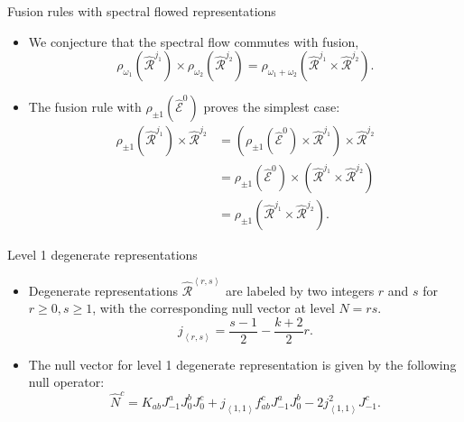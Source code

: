 \documentclass{beamer}
\newcommand{\vev}[1]{\left\langle #1 \right\rangle}
\begin{document}
\begin{frame}{Fusion rules with spectral flowed representations}
  \begin{itemize}
    \item We conjecture that the spectral flow commutes with fusion,  
      \begin{equation*}
          \rho_{\omega_{1}} \left(\widehat{\mathcal{R}}^{j_{1}}\right) \times \rho_{\omega_{2}} \left(\widehat{\mathcal{R}}^{j_{2}}\right) = \rho_{\omega_{1} + \omega_{2}} \left(\widehat{\mathcal{R}}^{j_{1}} \times\widehat{\mathcal{R}}^{j_{2}}\right). \label{SpecFus}
      \end{equation*}
    \item The fusion rule with $\rho_{\pm 1} \left(\widehat{\mathcal{E}}^{0}\right)$ proves the simplest case:
      \begin{equation*}
        \begin{aligned}
          \rho_{\pm 1} \left(\widehat{\mathcal{R}}^{j_{1}}\right) \times \widehat{\mathcal{R}}^{j_{2}} 
          &= \left(\rho_{\pm 1} \left( \widehat{\mathcal{E}}^{0} \right) \times \widehat{\mathcal{R}}^{j_{1}} \right) \times \widehat{\mathcal{R}}^{j_{2}}\\
          &= \rho_{\pm 1} \left( \widehat{\mathcal{E}}^{0} \right) \times \left( \widehat{\mathcal{R}}^{j_{1}}  \times \widehat{\mathcal{R}}^{j_{2}} \right) \\
          &= \rho_{\pm 1} \left(\widehat{\mathcal{R}}^{j_{1}} \times \widehat{\mathcal{R}}^{j_{2}} \right).
        \end{aligned}
      \end{equation*}
  \end{itemize}
\end{frame}

\begin{frame}{Level 1 degenerate representations}
  \begin{itemize}
    \item Degenerate representations $\widehat{\mathcal{R}}^{\vev{r,s}}$ are labeled by two integers $r$ and $s$ for $r \geq 0, s\geq 1 $, with 
    the corresponding null vector at level $N = rs$.
      \begin{equation*}
          j_{\vev{r,s}} = \frac{s-1}{2} - \frac{k+2}{2} r.
      \end{equation*}
    \item The null vector for level 1 degenerate representation is given by the following null operator:
      \begin{equation*}
          \hat{N}^{c} = K_{ab} J^{a}_{-1} J^{b}_{0} J^{c}_{0} + j_{\vev{1,1}} f^{c}_{ab} J^{a}_{-1} J^{b}_{0} - 2 j^{2}_{\vev{1,1}} J^{c}_{-1}.
      \end{equation*}
  \end{itemize}
\end{frame}
\end{document}
